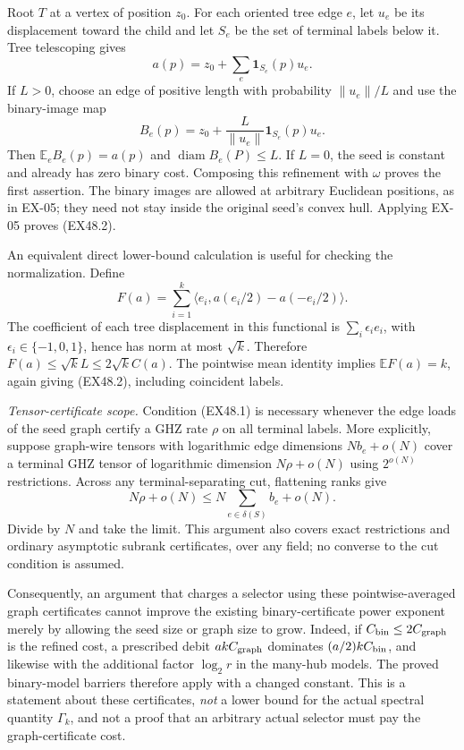 Root $T$ at a vertex of position $z_0$.  For each oriented tree edge
$e$, let $u_e$ be its displacement toward the child and let $S_e$
be the set of terminal labels below it.  Tree telescoping gives
\[
                         a(p)=z_0+\sum_e\mathbf1_{S_e}(p)u_e.
\]
If $L>0$, choose an edge of positive length with probability
$\|u_e\|/L$ and use the binary-image map
\[
               B_e(p)=z_0+\frac{L}{\|u_e\|}\mathbf1_{S_e}(p)u_e.
\]
Then $\mathbb E_e B_e(p)=a(p)$ and
$\operatorname{diam} B_e(P)\le L$.  If $L=0$, the seed is constant
and already has zero binary cost.  Composing this refinement with
$\omega$ proves the first assertion.  The binary images are allowed
at arbitrary Euclidean positions, as in EX-05; they need not stay
inside the original seed's convex hull.  Applying EX-05 proves
(EX48.2).

An equivalent direct lower-bound calculation is useful for checking
the normalization.  Define
\[
             F(a)=\sum_{i=1}^k
                  \langle e_i,a(e_i/2)-a(-e_i/2)\rangle.
\]
The coefficient of each tree displacement in this functional is
$\sum_i\epsilon_i e_i$, with $\epsilon_i\in\{-1,0,1\}$, hence has
norm at most $\sqrt k$.  Therefore
$F(a)\le\sqrt kL\le2\sqrt kC(a)$.  The pointwise mean identity
implies $\mathbb EF(a)=k$, again giving (EX48.2), including coincident
labels.

\emph{Tensor-certificate scope.}
Condition (EX48.1) is necessary whenever the edge loads of the seed
graph certify a GHZ rate $\rho$ on all terminal labels.  More
explicitly, suppose graph-wire tensors with logarithmic edge
dimensions $Nb_e+o(N)$ cover a terminal GHZ tensor of logarithmic
dimension $N\rho+o(N)$ using $2^{o(N)}$ restrictions.  Across any
terminal-separating cut, flattening ranks give
\[
                   N\rho+o(N)\le N\sum_{e\in\delta(S)}b_e+o(N).
\]
Divide by $N$ and take the limit.  This argument also covers exact
restrictions and ordinary asymptotic subrank certificates, over any
field; no converse to the cut condition is assumed.

Consequently, an argument that charges a selector using these
pointwise-averaged graph certificates cannot improve the existing
binary-certificate power exponent merely by allowing the seed size
or graph size to grow.  Indeed, if $C_{\rm bin}\le2C_{\rm graph}$
is the refined cost, a prescribed debit $akC_{\rm graph}$ dominates
$(a/2)kC_{\rm bin}$, and likewise with the additional factor
$\log_2r$ in the many-hub models.  The proved binary-model barriers
therefore apply with a changed constant.  This is a statement about
these certificates, \emph{not} a lower bound for the actual spectral
quantity $\Gamma_k$, and not a proof that an arbitrary actual selector
must pay the graph-certificate cost.

